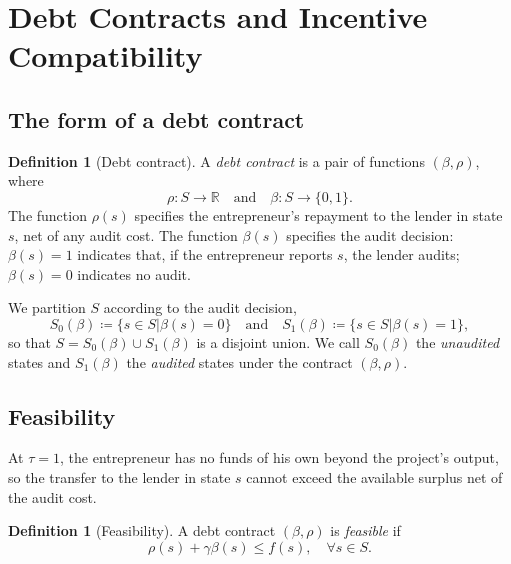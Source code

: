 \documentclass[11pt,a4paper,oneside]{book}
\def\R{\mathbb{R}}
\def\leq{\leqslant}
\def\et{\quad \text{and} \quad}
\theoremstyle{plain}
\theoremstyle{definition}
\newtheorem{definition}[theorem]{Definition}
\theoremstyle{remark}
\numberwithin{equation}{chapter}
\begin{document}
\section{Debt Contracts and Incentive Compatibility}
\label{sec:GH-contract}

\subsection{The form of a debt contract}

\begin{definition}[Debt contract]\label{def:GH-contract}
A \emph{debt contract} is a pair of functions $(\beta, \rho)$, where
\begin{equation*}
  \rho : S \longrightarrow \R
  \et
  \beta : S \longrightarrow \{0, 1\}.
\end{equation*}
The function $\rho(s)$ specifies the entrepreneur's repayment to the lender in state $s$, net of any audit cost.
The function $\beta(s)$ specifies the audit decision: $\beta(s) = 1$ indicates that, if the entrepreneur reports $s$, the lender audits; $\beta(s) = 0$ indicates no audit.
\end{definition}

We partition $S$ according to the audit decision,
\begin{equation}\label{eq:S01-def}
  S_0(\beta) \coloneqq \{ s \in S \vert \beta(s) = 0 \}
  \et
  S_1(\beta) \coloneqq \{ s \in S \vert \beta(s) = 1 \},
\end{equation}
so that $S = S_0(\beta) \cup S_1(\beta)$ is a disjoint union.
We call $S_0(\beta)$ the \emph{unaudited} states and $S_1(\beta)$ the \emph{audited} states under the contract $(\beta, \rho)$.

\subsection{Feasibility}

At $\tau = 1$, the entrepreneur has no funds of his own beyond the project's output, so the transfer to the lender in state $s$ cannot exceed the available surplus net of the audit cost.

\begin{definition}[Feasibility]\label{def:GH-feasibility}
A debt contract $(\beta, \rho)$ is \emph{feasible} if
\begin{equation}\label{eq:F}
  \rho(s) + \gamma \beta(s) \leq f(s), \quad \forall s \in S.
  \tag{F}
\end{equation}
\end{definition}
\end{document}
